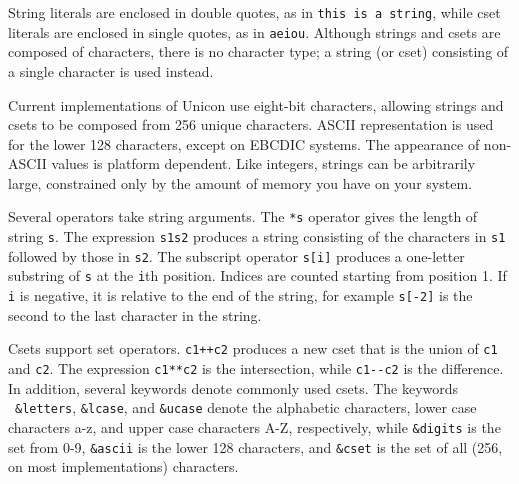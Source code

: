 String literals are enclosed in double quotes, as
in \texttt{{\textquotedbl}this is a string{\textquotedbl}}, while
cset literals are enclosed in single quotes, as in
\texttt{{\textquotesingle}aeiou{\textquotesingle}}. Although strings
and csets are composed of characters, there is no
character type; a string (or cset) consisting of a
single character is used instead.

Current implementations of Unicon use eight-bit characters, allowing
strings and csets to be composed from 256 unique characters.
ASCII representation is used for the lower 128 characters,
except on EBCDIC systems. The appearance of non-ASCII
values is platform dependent. Like integers, strings can be arbitrarily
large, constrained only by the amount of memory you have on your
system.

Several operators take string arguments. The \texttt{*s} operator gives the length
of string \texttt{s}. The expression \texttt{s1{\textbar}{\textbar}s2} produces a
string consisting of the characters in \texttt{s1} followed by those in
\texttt{s2}. The subscript operator
\texttt{s[i]} produces a one-letter
substring of \texttt{s} at the \texttt{i}th position.
Indices are counted starting from
position 1. If \texttt{i} is negative, it is relative to the end of the
string, for example \texttt{s[-2]} is the second to the last character
in the string.

Csets support set operators. \texttt{c1++c2}
produces a new cset that is the union of \texttt{c1} and \texttt{c2}.
The expression \texttt{c1**c2} is the
intersection, while \texttt{c1-{}-c2} is
the difference. In addition, several keywords denote commonly used
csets. The keywords \ \texttt{\&letters},
\texttt{\&lcase}, and \texttt{\&ucase} denote the alphabetic
characters, lower case characters a-z, and
upper case characters A-Z, respectively, while
\texttt{\&digits} is the set from 0-9,
\texttt{\&ascii} is the lower 128 characters, and
\texttt{\&cset} is the set of all (256,
on most implementations) characters.

